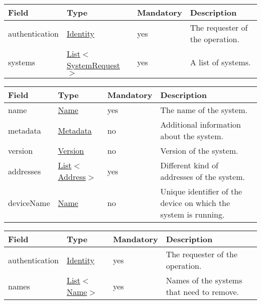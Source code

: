 \documentclass[a4paper]{arrowhead}
\newcommand{\pref}[1]{{\textcolor{ArrowheadGrey}{\hyperref[sec:model:primitives:#1]{#1}}}}
\begin{document}
\label{sec:model:SystemListRequest}
 
\begin{table}[ht!]
\begin{tabularx}{\textwidth}{| p{3cm} | p{3.4cm} | p{2cm} | X |} \hline
\rowcolor{gray!33} Field & Type & Mandatory & Description \\ \hline
authentication & \hyperref[sec:model:Identity]{Identity} & yes & The requester of the operation. \\ \hline
systems & \pref{List}$<$\hyperref[sec:model:SystemRequest]{SystemRequest}$>$ & yes & A list of systems. \\ \hline
\end{tabularx}
\end{table}

\label{sec:model:SystemRequest}
 
\begin{table}[ht!]
\begin{tabularx}{\textwidth}{| p{3cm} | p{3cm} | p{2cm} | X |} \hline
\rowcolor{gray!33} Field & Type & Mandatory & Description \\ \hline
name & \pref{Name} & yes & The name of the system. \\ \hline
metadata &\hyperref[sec:model:Metadata]{Metadata} & no & Additional information about the system. \\ \hline
version &\pref{Version} & no & Version of the system. \\ \hline
addresses &  \pref{List}$<$\pref{Address}$>$ & yes & Different kind of addresses of the system.  \\ \hline
deviceName & \pref{Name} & no & Unique identifier of the device on which the system is running. \\ \hline
\end{tabularx}
\end{table}

\label{sec:model:SystemRemoveRequest}

\begin{table}[ht!]
\begin{tabularx}{\textwidth}{| p{4.1cm} | p{4.8cm} | p{2cm} | X |} \hline
\rowcolor{gray!33} Field & Type & Mandatory & Description \\ \hline
authentication & \hyperref[sec:model:Identity]{Identity} & yes & The requester of the operation. \\ \hline
names &  \pref{List}$<$\pref{Name}$>$ & yes & Names of the systems that need to remove. \\ \hline
\end{tabularx}
\end{table}
\end{document}

